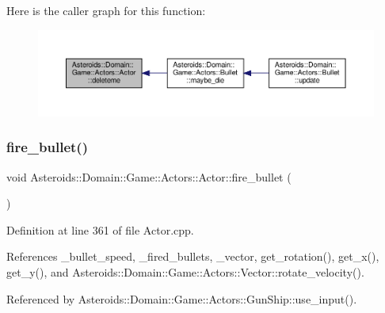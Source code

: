 Here is the caller graph for this function\+:\nopagebreak
\begin{figure}[H]
\begin{center}
\leavevmode
\includegraphics[width=350pt]{classAsteroids_1_1Domain_1_1Game_1_1Actors_1_1Actor_afb9985ff7dea1fe2d21b365a7aec8a45_icgraph}
\end{center}
\end{figure}
\mbox{\label{classAsteroids_1_1Domain_1_1Game_1_1Actors_1_1Actor_ad108a838180454ac98facde4518d7660}} 
\subsubsection{\texorpdfstring{fire\+\_\+bullet()}{fire\_bullet()}}
{\footnotesize\ttfamily void Asteroids\+::\+Domain\+::\+Game\+::\+Actors\+::\+Actor\+::fire\+\_\+bullet (\begin{DoxyParamCaption}{ }\end{DoxyParamCaption})\hspace{0.3cm}{\ttfamily [protected]}}



Definition at line 361 of file Actor.\+cpp.



References \+\_\+bullet\+\_\+speed, \+\_\+fired\+\_\+bullets, \+\_\+vector, get\+\_\+rotation(), get\+\_\+x(), get\+\_\+y(), and Asteroids\+::\+Domain\+::\+Game\+::\+Actors\+::\+Vector\+::rotate\+\_\+velocity().



Referenced by Asteroids\+::\+Domain\+::\+Game\+::\+Actors\+::\+Gun\+Ship\+::use\+\_\+input().

